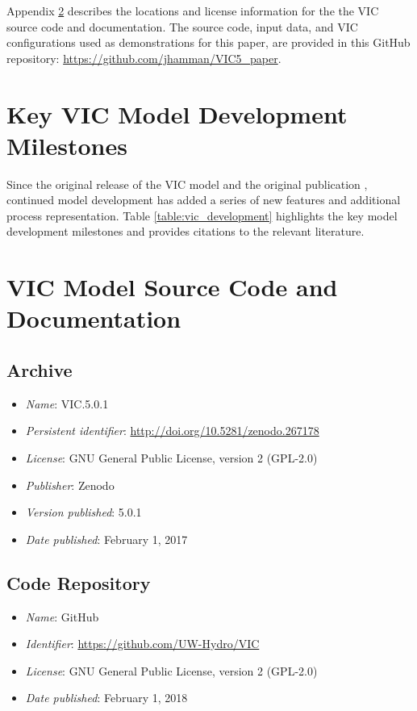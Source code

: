 \documentclass[gmd, manuscript]{copernicus}
\begin{document}
  Appendix \ref{appendix:source_code} describes the locations and license information for the the VIC source code and documentation. The source code, input data, and VIC configurations used as demonstrations for this paper, are provided in this GitHub repository: \url{https://github.com/jhamman/VIC5_paper}.

\appendix

\section{Key VIC Model Development Milestones}
\label{appendix:model_development}

Since the original release of the VIC model and the original publication \citet{Liang_1994}, continued model development has added a series of new features and additional process representation. Table \ref{table:vic_development} highlights the key model development milestones and provides citations to the relevant literature.

\section{VIC Model Source Code and Documentation}
\label{appendix:source_code}

\subsection{Archive}

\begin{itemize}
	\item \textit{Name}: VIC.5.0.1
	\item \textit{Persistent identifier}: \url{http://doi.org/10.5281/zenodo.267178}
	\item \textit{License}: GNU General Public License, version 2 (GPL-2.0)
	\item \textit{Publisher}: Zenodo
	\item \textit{Version published}: 5.0.1
	\item \textit{Date published}: February 1, 2017
\end{itemize}

\subsection{Code Repository}

\begin{itemize}
	\item \textit{Name}: GitHub
	\item \textit{Identifier}: \url{https://github.com/UW-Hydro/VIC}
	\item \textit{License}: GNU General Public License, version 2 (GPL-2.0)
	\item \textit{Date published}: February 1, 2018
\end{itemize}
\end{document}
